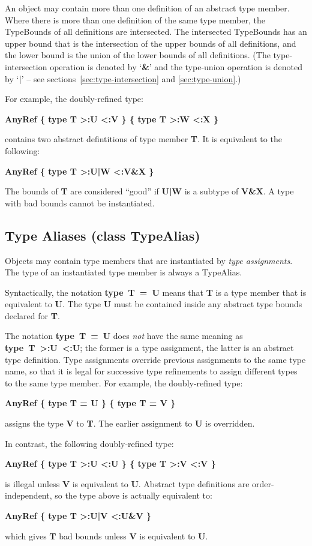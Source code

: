 \documentclass[11pt]{report}
\newcommand{\cdf}{\bf\ttfamily} %
\newcommand{\cd}{\cdf\small}  %
\begin{document}
An object may contain more than one definition of an abstract type member. Where there is more than one definition of the same type member, the TypeBounds of all definitions are intersected. The intersected TypeBounds has an upper bound that is the intersection of the upper bounds of all definitions, and the lower bound is the union of the lower bounds of all definitions. (The type-intersection operation is denoted by `{\cd \&}' and the type-union operation is denoted by `{\cd |}' -- see sections~\ref{sec:type-intersection} and \ref{sec:type-union}.)

For example, the doubly-refined type:
\begin{center}
	{\cd AnyRef \{ type T >:U <:V \} \{ type T >:W <:X \}}
\end{center}
contains two abstract defintitions of type member {\cd T}. It is equivalent to the following:
\begin{center}
	{\cd AnyRef \{ type T >:U|W <:V\&X \}}
\end{center}
The bounds of {\cd T} are considered ``good'' if {\cd U|W} is a subtype of {\cd V\&X}.
A type with bad bounds cannot be instantiated.

\subsection{Type Aliases (class TypeAlias)}  \label{sec:type-aliases}

Objects may contain type members that are instantiated by {\em type assignments}.
The type of an instantiated type member is always a TypeAlias.

Syntactically, the notation \mbox{{\cd type T = U}} means that {\cd T} is a type member that is equivalent to {\cd U}. The type {\cd U} must be contained inside any abstract type bounds declared for {\cd T}.

The notation \mbox{{\cd type T = U}} does {\em not} have the same meaning as \mbox{{\cd type T >:U <:U}}; the former is a type assignment, the latter is an abstract type definition. Type assignments override previous assignments to the same type name, so that it is legal for successive type refinements to assign different types to the same type member. For example, the doubly-refined type:
\begin{center}
	{\cd AnyRef \{ type T = U \} \{ type T = V \}}
\end{center}
assigns the type {\cd V} to {\cd T}. The earlier assignment to {\cd U} is overridden.

In contrast, the following doubly-refined type:
\begin{center}
	{\cd AnyRef \{ type T >:U <:U \} \{ type T >:V <:V \}}
\end{center}
is illegal unless {\cd V} is equivalent to {\cd U}. Abstract type definitions are order-independent, so the type above is actually equivalent to:
\begin{center}
	{\cd AnyRef \{ type T >:U|V <:U\&V \}}
\end{center}
which gives {\cd T} bad bounds unless {\cd V} is equivalent to {\cd U}.
\end{document}
